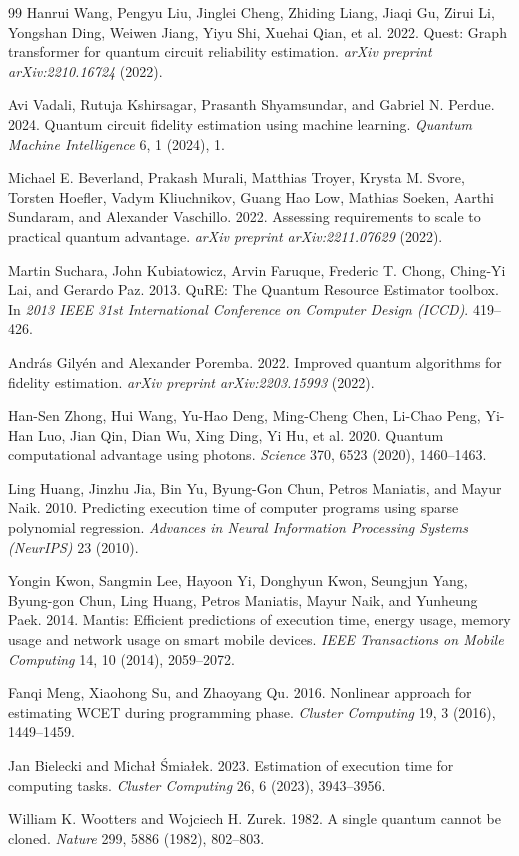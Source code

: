 \documentclass[11pt, a4paper]{article}
\begin{document}
\begin{thebibliography}{99}
Hanrui Wang, Pengyu Liu, Jinglei Cheng, Zhiding Liang, Jiaqi Gu, Zirui Li, Yongshan Ding, Weiwen Jiang, Yiyu Shi, Xuehai Qian, et al. 2022. Quest: Graph transformer for quantum circuit reliability estimation. \textit{arXiv preprint arXiv:2210.16724} (2022).

Avi Vadali, Rutuja Kshirsagar, Prasanth Shyamsundar, and Gabriel N. Perdue. 2024. Quantum circuit fidelity estimation using machine learning. \textit{Quantum Machine Intelligence} 6, 1 (2024), 1.

Michael E. Beverland, Prakash Murali, Matthias Troyer, Krysta M. Svore, Torsten Hoefler, Vadym Kliuchnikov, Guang Hao Low, Mathias Soeken, Aarthi Sundaram, and Alexander Vaschillo. 2022. Assessing requirements to scale to practical quantum advantage. \textit{arXiv preprint arXiv:2211.07629} (2022).

Martin Suchara, John Kubiatowicz, Arvin Faruque, Frederic T. Chong, Ching-Yi Lai, and Gerardo Paz. 2013. QuRE: The Quantum Resource Estimator toolbox. In \textit{2013 IEEE 31st International Conference on Computer Design (ICCD)}. 419--426.

Andr{\'a}s Gily{\'e}n and Alexander Poremba. 2022. Improved quantum algorithms for fidelity estimation. \textit{arXiv preprint arXiv:2203.15993} (2022).

Han-Sen Zhong, Hui Wang, Yu-Hao Deng, Ming-Cheng Chen, Li-Chao Peng, Yi-Han Luo, Jian Qin, Dian Wu, Xing Ding, Yi Hu, et al. 2020. Quantum computational advantage using photons. \textit{Science} 370, 6523 (2020), 1460--1463.

Ling Huang, Jinzhu Jia, Bin Yu, Byung-Gon Chun, Petros Maniatis, and Mayur Naik. 2010. Predicting execution time of computer programs using sparse polynomial regression. \textit{Advances in Neural Information Processing Systems (NeurIPS)} 23 (2010).

Yongin Kwon, Sangmin Lee, Hayoon Yi, Donghyun Kwon, Seungjun Yang, Byung-gon Chun, Ling Huang, Petros Maniatis, Mayur Naik, and Yunheung Paek. 2014. Mantis: Efficient predictions of execution time, energy usage, memory usage and network usage on smart mobile devices. \textit{IEEE Transactions on Mobile Computing} 14, 10 (2014), 2059--2072.

Fanqi Meng, Xiaohong Su, and Zhaoyang Qu. 2016. Nonlinear approach for estimating WCET during programming phase. \textit{Cluster Computing} 19, 3 (2016), 1449--1459.

Jan Bielecki and Micha{\l} {\'S}mia{\l}ek. 2023. Estimation of execution time for computing tasks. \textit{Cluster Computing} 26, 6 (2023), 3943--3956.

William K. Wootters and Wojciech H. Zurek. 1982. A single quantum cannot be cloned. \textit{Nature} 299, 5886 (1982), 802--803.

\end{thebibliography}
\end{document}
